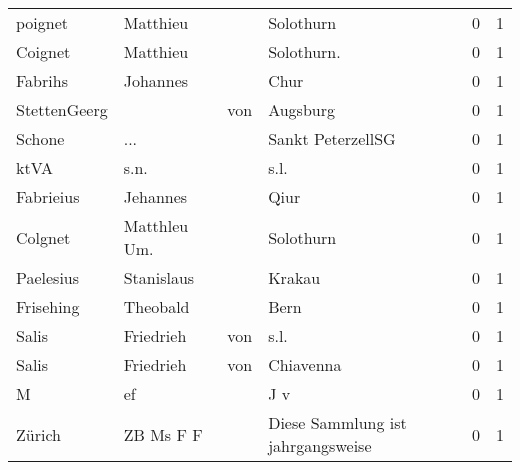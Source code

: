 \begin{tabular}{llllrr}
                  poignet &                           Matthieu &             &                                   Solothurn &          0 &         1 \\
                  Coignet &                           Matthieu &             &                                 Solothurn.  &          0 &         1 \\
                  Fabrihs &                           Johannes &             &                                        Chur &          0 &         1 \\
             StettenGeerg &                                    &         von &                                    Augsburg &          0 &         1 \\
                   Schone &                                ... &             &                           Sankt PeterzellSG &          0 &         1 \\
                     ktVA &                               s.n. &             &                                        s.l. &          0 &         1 \\
                Fabrieius &                           Jehannes &             &                                        Qiur &          0 &         1 \\
                  Colgnet &                       Matthleu Um. &             &                                   Solothurn &          0 &         1 \\
                Paelesius &                         Stanislaus &             &                                      Krakau &          0 &         1 \\
                Frisehing &                           Theobald &             &                                        Bern &          0 &         1 \\
                    Salis &                          Friedrieh &         von &                                        s.l. &          0 &         1 \\
                    Salis &                          Friedrieh &         von &                                   Chiavenna &          0 &         1 \\
                        M &                                 ef &             &                                         J v &          0 &         1 \\
                   Zürich &                          ZB Ms F F &             &           Diese Sammlung ist jahrgangsweise &          0 &         1 \\

\end{tabular}
